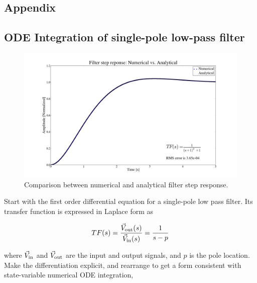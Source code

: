 \documentclass[a4paper,12pt]{article}
\begin{document}
\begin{appendix}

\section{Appendix}

\subsection{ODE Integration of single-pole low-pass filter}
\label{App:ODE_integration}

\begin{figure}
\centering
\includegraphics[scale=0.265]{../figures/filter_step_response.png}
\caption{Comparison between numerical and analytical filter step response.}
\label{fig:filter_step_response}
\end{figure}


Start with the first order differential equation for a single-pole low pass filter. Its transfer function is expressed in Laplace form as

\begin{equation}
 TF(s)=\frac{\vec V_{\rm out}(s)}{\vec V_{\rm in}(s)} = \frac{1}{s-p}
\end{equation}

\noindent where $\vec V_{\rm in}$ and $\vec V_{\rm out}$ are the input and output signals, and $p$ is the pole location. Make the differentiation explicit, and rearrange to get a form consistent with state-variable numerical ODE integration,


\end{appendix}
\end{document}
